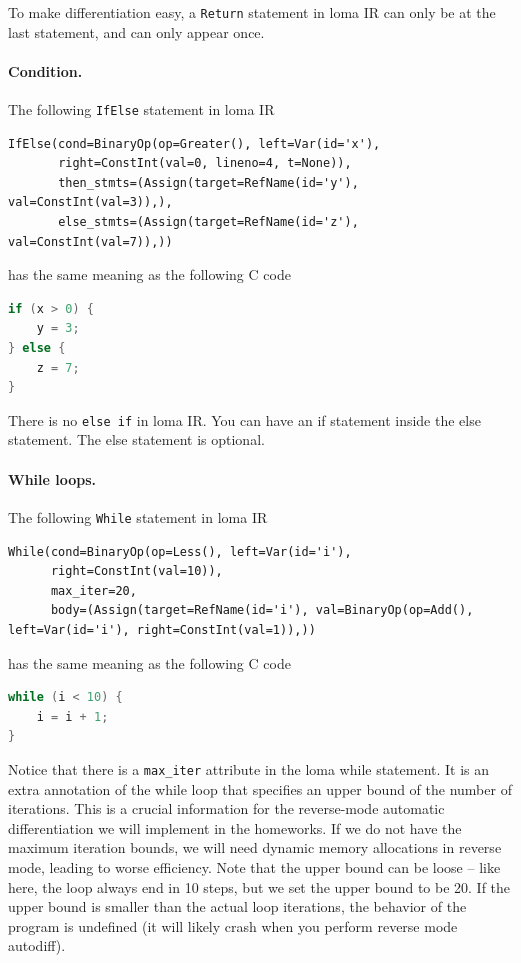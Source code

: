 To make differentiation easy, a \lstinline{Return} statement in loma IR can only be at the last statement, and can only appear once.

\paragraph{Condition.}
The following \lstinline{IfElse} statement in loma IR
\begin{lstlisting}
IfElse(cond=BinaryOp(op=Greater(), left=Var(id='x'),
       right=ConstInt(val=0, lineno=4, t=None)),
       then_stmts=(Assign(target=RefName(id='y'), val=ConstInt(val=3)),),
       else_stmts=(Assign(target=RefName(id='z'), val=ConstInt(val=7)),))
\end{lstlisting}
has the same meaning as the following C code
\begin{lstlisting}[language=c]
if (x > 0) {
    y = 3;
} else {
    z = 7;
}
\end{lstlisting}

There is no \lstinline{else if} in loma IR. You can have an if statement inside the else statement. The else statement is optional.

\paragraph{While loops.}
The following \lstinline{While} statement in loma IR
\begin{lstlisting}
While(cond=BinaryOp(op=Less(), left=Var(id='i'),
      right=ConstInt(val=10)),
      max_iter=20,
      body=(Assign(target=RefName(id='i'), val=BinaryOp(op=Add(), left=Var(id='i'), right=ConstInt(val=1)),))
\end{lstlisting}
has the same meaning as the following C code
\begin{lstlisting}[language=c]
while (i < 10) {
    i = i + 1;
}
\end{lstlisting}
Notice that there is a \lstinline{max_iter} attribute in the loma while statement. It is an extra annotation of the while loop that specifies an upper bound of the number of iterations. This is a crucial information for the reverse-mode automatic differentiation we will implement in the homeworks. If we do not have the maximum iteration bounds, we will need dynamic memory allocations in reverse mode, leading to worse efficiency. Note that the upper bound can be loose -- like here, the loop always end in 10 steps, but we set the upper bound to be 20. If the upper bound is smaller than the actual loop iterations, the behavior of the program is undefined (it will likely crash when you perform reverse mode autodiff).

